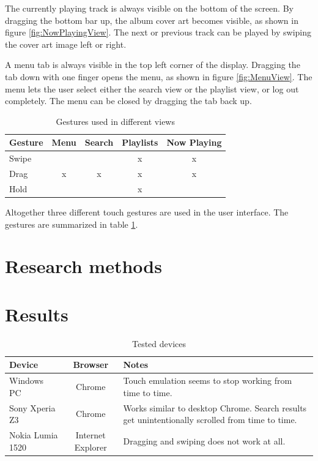 \documentclass[conference]{IEEEtran}
\begin{document}
The currently playing track is always visible on the bottom of the screen.
By dragging the bottom bar up, the album cover art becomes visible, as shown in figure \ref{fig:NowPlayingView}.
The next or previous track can be played by swiping the cover art image left or right.

A menu tab is always visible in the top left corner of the display.
Dragging the tab down with one finger opens the menu, as shown in figure \ref{fig:MenuView}.
The menu lets the user select either the search view or the playlist view, or log out completely.
The menu can be closed by dragging the tab back up.

\begin{table}[htbp]
    \centering
    \begin{tabular}{|l | c | c | c | c |}
        \hline
         Gesture & Menu & Search & Playlists & Now Playing \\ \hline
         Swipe &   &   & x & x \\ \hline
         Drag  & x & x & x & x \\ \hline
         Hold  &   &   & x &   \\ \hline
    \end{tabular}
    \caption{Gestures used in different views}
    \label{tab:Gestures}
\end{table}

Altogether three different touch gestures are used in the user interface.
The gestures are summarized in table \ref{tab:Gestures}.


\section{Research methods}

\section{Results}

\begin{table}[htbp]
    \centering
    \begin{tabular}{| l | c | p{4cm} |}
        \hline
        Device & Browser & Notes \\ \hline
        Windows PC & Chrome & Touch emulation seems to stop working from time to time. \\ \hline
        Sony Xperia Z3 & Chrome & Works similar to desktop Chrome. Search results get unintentionally scrolled from time to time. \\ \hline
        Nokia Lumia 1520 & Internet Explorer & Dragging and swiping does not work at all. \\ \hline
    \end{tabular}
    \caption{Tested devices}
    \label{tab:devices}
\end{table}
\end{document}
